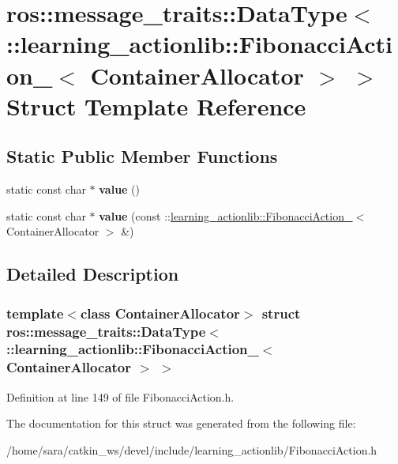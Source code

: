 \hypertarget{structros_1_1message__traits_1_1DataType_3_01_1_1learning__actionlib_1_1FibonacciAction___3_01ContainerAllocator_01_4_01_4}{}\section{ros\+:\+:message\+\_\+traits\+:\+:Data\+Type$<$ \+:\+:learning\+\_\+actionlib\+:\+:Fibonacci\+Action\+\_\+$<$ Container\+Allocator $>$ $>$ Struct Template Reference}
\label{structros_1_1message__traits_1_1DataType_3_01_1_1learning__actionlib_1_1FibonacciAction___3_01ContainerAllocator_01_4_01_4}
\subsection*{Static Public Member Functions}
\begin{DoxyCompactItemize}
\item 
\mbox{\label{structros_1_1message__traits_1_1DataType_3_01_1_1learning__actionlib_1_1FibonacciAction___3_01ContainerAllocator_01_4_01_4_abb7c12190fb04acbcf2d4fadbc518241}} 
static const char $\ast$ {\bfseries value} ()
\item 
\mbox{\label{structros_1_1message__traits_1_1DataType_3_01_1_1learning__actionlib_1_1FibonacciAction___3_01ContainerAllocator_01_4_01_4_aa2e1389aa9b79912713a182081bdbdd6}} 
static const char $\ast$ {\bfseries value} (const \+::\hyperlink{structlearning__actionlib_1_1FibonacciAction__}{learning\+\_\+actionlib\+::\+Fibonacci\+Action\+\_\+}$<$ Container\+Allocator $>$ \&)
\end{DoxyCompactItemize}


\subsection{Detailed Description}
\subsubsection*{template$<$class Container\+Allocator$>$\newline
struct ros\+::message\+\_\+traits\+::\+Data\+Type$<$ \+::learning\+\_\+actionlib\+::\+Fibonacci\+Action\+\_\+$<$ Container\+Allocator $>$ $>$}



Definition at line 149 of file Fibonacci\+Action.\+h.



The documentation for this struct was generated from the following file\+:\begin{DoxyCompactItemize}
\item 
/home/sara/catkin\+\_\+ws/devel/include/learning\+\_\+actionlib/Fibonacci\+Action.\+h\end{DoxyCompactItemize}
